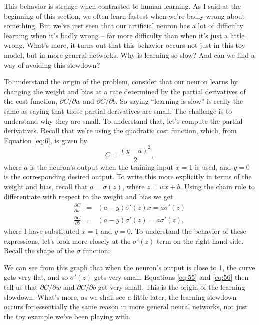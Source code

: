 \documentclass[a4paper,twoside,10pt]{book}
\begin{document}
This behavior is strange when contrasted to human learning. As I said at the beginning of this section, we often learn fastest when we're badly wrong about something. But we've just seen that our artificial neuron has a lot of difficulty learning when it's badly wrong -- far more difficulty than when it's just a little wrong. What's more, it turns out that this behavior occurs not just in this toy model, but in more general networks. Why is learning so slow? And can we find a way of avoiding this slowdown?

To understand the origin of the problem, consider that our neuron learns by changing the weight and bias at a rate determined by the partial derivatives of the cost function, $\partial{}C/\partial{}w$ and $\partial{}C/\partial{}b$. So saying ``learning is slow'' is really the same as saying that those partial derivatives are small. The challenge is to understand why they are small. To understand that, let's compute the partial derivatives. Recall that we're using the quadratic cost function, which, from Equation \ref{eq:6}, is given by
\begin{equation}
C = \frac{(y-a)^2}2,\label{eq:54}
\end{equation}
where $a$ is the neuron's output when the training input $x=1$ is used, and $y=0$ is the corresponding desired output. To write this more explicitly in terms of the weight and bias, recall that $a=\sigma{}(z)$, where $z=wx+b$. Using the chain rule to differentiate with respect to the weight and bias we get
\begin{eqnarray} 
\frac{\partial C}{\partial w} & = & (a-y)\sigma'(z) x = a \sigma'(z) \label{eq:55}\\
\frac{\partial C}{\partial b} & = & (a-y)\sigma'(z) = a \sigma'(z),
\label{eq:56}
\end{eqnarray}
where I have substituted $x=1$ and $y=0$. To understand the behavior of these expressions, let's look more closely at the $\sigma{}'(z)$ term on the right-hand side. Recall the shape of the $\sigma{}$ function:
\begin{center}
\end{center}
We can see from this graph that when the neuron's output is close to 1, the curve gets very flat, and so $\sigma{}'(z)$ gets very small. Equations \ref{eq:55} and \ref{eq:56} then tell us that $\partial{}C/\partial{}w$ and $\partial{}C/\partial{}b$ get very small. This is the origin of the learning slowdown. What's more, as we shall see a little later, the learning slowdown occurs for essentially the same reason in more general neural networks, not just the toy example we've been playing with.
\end{document}
